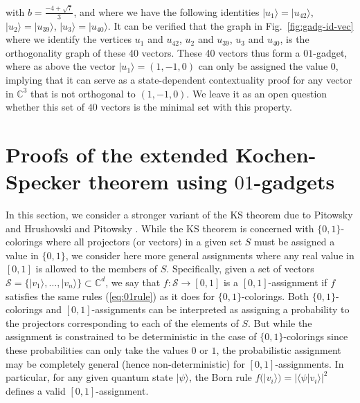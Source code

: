 \documentclass[twocolumn, a4paper, superscriptaddress,nofootinbib, accepted=2020-08-07, hyperref]{quantumarticle}
\begin{document}
with $b = \frac{-4+\sqrt{7}}{3}$, and where we have the following identities $|u_{1}\rangle=|u_{42}\rangle$, $|u_2\rangle=|u_{39}\rangle$,  $|u_3\rangle=|u_{40}\rangle$. It can be verified that the graph in Fig.~\ref{fig:gadg-id-vec} where we identify the vertices $u_{1}$ and $u_{42}$, $u_2$ and $u_{39}$,  $u_3$ and $u_{40}$, is the orthogonality graph of these 40 vectors. These 40 vectors thus form a $01$-gadget, where as above the vector $|u_1\rangle=(1,-1,0)$ can only be assigned the value $0$, implying that it can serve as a state-dependent contextuality proof for any vector in $\mathbb{C}^3$ that is not orthogonal to $(1,-1,0)$. We leave it as an open question whether this set of $40$ vectors is the minimal set with this property. 

 
 


\section{Proofs of the extended Kochen-Specker theorem using $01$-gadgets}\label{sec:ext}
In this section, we consider a stronger variant of the KS theorem due to Pitowsky \cite{Pitowsky} and Hrushovski and Pitowsky \cite{HP03}. While the KS theorem is concerned with $\{0,1\}$-colorings where all projectors (or vectors) in a given set $S$ must be assigned a value in $\{0,1\}$, we consider here more general assignments where any real value in $[0,1]$ is allowed to the members of $S$. Specifically, given a set of vectors $\mathcal{S}=\{|v_1\rangle,\ldots,|v_n\rangle\}\subset\mathbb{C}^d$, we say that $f:\mathcal{S}\rightarrow [0,1]$ is a $[0,1]$-assignment if $f$ satisfies the same rules (\ref{eq:01rule}) as it does for $\{0,1\}$-colorings.
Both $\{0,1\}$-colorings and $[0,1]$-assignments can be interpreted as assigning a probability to the projectors corresponding to each of the elements of $S$. But while the assignment is constrained to be deterministic in the case of $\{0,1\}$-colorings since these probabilities can only take the values $0$ or $1$, the probabilistic assignment may be completely general (hence non-deterministic) for $[0,1]$-assignments. In particular, for any given quantum state $|\psi\rangle$, the Born rule $f(|v_i\rangle)=|\langle \psi|v_i\rangle|^2$ defines a valid $[0,1]$-assignment.
\end{document}
